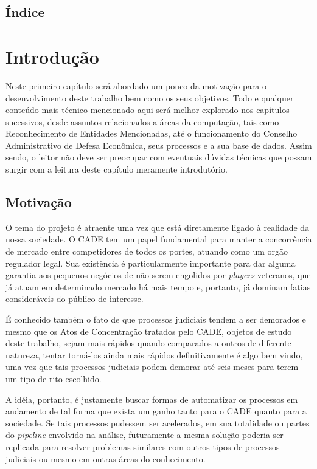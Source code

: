 \documentclass[11pt]{report}
\begin{document}
\pagebreak
\thispagestyle{empty}
\section*{Índice}

\pagebreak
\chapter{Introdução}
\indent\indent Neste primeiro capítulo será abordado um pouco da motivação para o desenvolvimento deste trabalho bem como os seus objetivos. Todo e qualquer conteúdo
mais técnico mencionado aqui será melhor explorado nos capítulos sucessivos, desde assuntos relacionados a áreas da computação, tais como Reconhecimento de Entidades
Mencionadas, até o funcionamento do Conselho Administrativo de Defesa Econômica, seus processos e a sua base de dados. Assim sendo, o leitor não deve ser preocupar
com eventuais dúvidas técnicas que possam surgir com a leitura deste capítulo meramente introdutório.

\section{Motivação}
\indent\indent O tema do projeto é atraente uma vez que está diretamente ligado à realidade da nossa sociedade. O CADE tem um papel
fundamental para manter a concorrência de mercado entre competidores de todos os portes, atuando como um orgão regulador legal. Sua existência é
particularmente importante para dar alguma garantia aos pequenos negócios de não serem engolidos por \textit{players} veteranos, que
já atuam em determinado mercado há mais tempo e, portanto, já dominam fatias consideráveis do público de interesse.

É conhecido também o fato de que processos judiciais tendem a ser demorados e mesmo que os Atos de Concentração tratados pelo CADE, objetos de estudo deste
trabalho, sejam mais rápidos quando comparados a outros de diferente natureza, tentar torná-los ainda mais rápidos definitivamente é algo bem vindo, uma vez que
tais processos judiciais podem demorar até seis meses para terem um tipo de rito escolhido.

A idéia, portanto, é justamente buscar formas de automatizar os processos em andamento de tal forma que exista um ganho tanto para o CADE quanto para a sociedade.
Se tais processos pudessem ser acelerados, em sua totalidade ou partes do \textit{pipeline} envolvido na análise, futuramente a mesma solução poderia ser replicada
para resolver problemas similares com outros tipos de processos judiciais ou mesmo em outras áreas do conhecimento.
\end{document}
